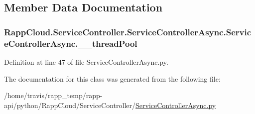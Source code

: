 \subsection{Member Data Documentation}
\hypertarget{classRappCloud_1_1ServiceController_1_1ServiceControllerAsync_1_1ServiceControllerAsync_a1fac92ab781148dc7a9f2881c0757a85}{
\subsubsection[{\-\_\-\-\_\-thread\-Pool}]{\setlength{\rightskip}{0pt plus 5cm}Rapp\-Cloud.\-Service\-Controller.\-Service\-Controller\-Async.\-Service\-Controller\-Async.\-\_\-\-\_\-thread\-Pool\hspace{0.3cm}{\ttfamily [private]}}}\label{classRappCloud_1_1ServiceController_1_1ServiceControllerAsync_1_1ServiceControllerAsync_a1fac92ab781148dc7a9f2881c0757a85}


Definition at line 47 of file Service\-Controller\-Async.\-py.



The documentation for this class was generated from the following file\-:\begin{DoxyCompactItemize}
\item 
/home/travis/rapp\-\_\-temp/rapp-\/api/python/\-Rapp\-Cloud/\-Service\-Controller/\hyperlink{ServiceControllerAsync_8py}{Service\-Controller\-Async.\-py}\end{DoxyCompactItemize}
